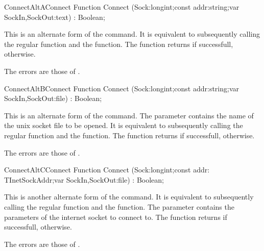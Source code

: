 \html{}
\begin{functionl}{Connect}{AltAConnect}
\Declaration
Function Connect (Sock:longint;const addr:string;var SockIn,SockOut:text) : Boolean;

\Description
 This is an alternate form of the  command. 
It is equivalent
to subsequently calling the regular  function and the 
 function.
The function returns  if successfull,  otherwise.

\Errors
The errors are those of .
\SeeAlso
{}
\end{functionl}
\begin{functionl}{Connect}{AltBConnect}
\Declaration
Function Connect (Sock:longint;const addr:string;var SockIn,SockOut:file) : Boolean;

\Description
 This is an alternate form of the  command. The parameter
 contains the name of the unix socket file to be opened. 
It is equivalent to subsequently calling the regular  
function and the   function.
The function returns  if successfull,  otherwise.

\Errors
The errors are those of .
\SeeAlso
{}
\end{functionl}
\begin{functionl}{Connect}{AltCConnect}
\Declaration
Function Connect (Sock:longint;const addr: TInetSockAddr;var SockIn,SockOut:file) : Boolean;

\Description
 This is another alternate form of the  command. 
It is equivalent
to subsequently calling the regular  function and the 
 function. The  parameter contains the parameters
of the internet socket to connect to.
The function returns  if successfull,  otherwise.

\Errors
The errors are those of .
\SeeAlso
{}
\end{functionl}
\html{}
